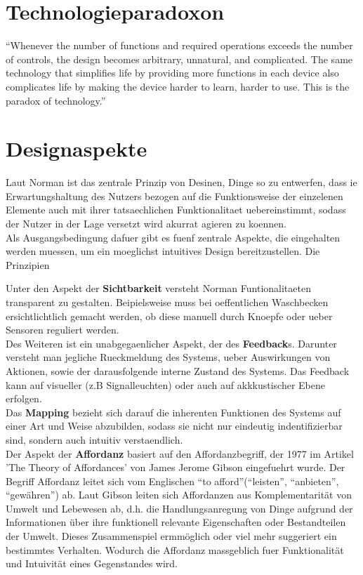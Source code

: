 \documentclass[parskip,headsepline, headtopline, %
footsepline, oneside, 12pt, headings=small]{scrreprt}
\begin{document}
\section{Technologieparadoxon}

“Whenever the number of functions and required operations exceeds the number of controls, the design becomes arbitrary, unnatural, and complicated. 
	The same technology that simplifies life by providing more functions in each device also complicates life by making the device harder to learn, harder to use. This is the paradox of technology.”

\section{Designaspekte}

Laut Norman ist das zentrale Prinzip von Desinen, Dinge so zu entwerfen, dass ie Erwartungshaltung des Nutzers bezogen auf die Funktionsweise der einzelenen Elemente auch mit ihrer tatsaechlichen Funktionalitaet uebereinstimmt, sodass der Nutzer in der Lage versetzt wird akurrat agieren zu koennen.\\ 
Als Ausgangsbedingung dafuer gibt es fuenf zentrale Aspekte, die eingehalten werden muessen, um  ein moeglichst intuitives Design bereitzustellen. Die Prinzipien 
	
Unter den Aspekt der \textbf{Sichtbarkeit} versteht Norman Funtionalitaeten transparent zu gestalten. Beipielsweise muss bei oeffentlichen Waschbecken ersichtlichtlich gemacht werden, ob diese manuell durch Knoepfe oder ueber Sensoren reguliert werden.\\
   
Des Weiteren ist ein unabgegaenlicher Aspekt, der des \textbf{Feedback}s. Darunter versteht man jegliche Rueckmeldung des Systems, ueber Auswirkungen von Aktionen, sowie der darausfolgende interne Zustand des Systems. Das Feedback kann auf visueller (z.B Signalleuchten) oder auch auf akkkustischer Ebene erfolgen.\\
 
Das	\textbf{Mapping} bezieht sich darauf die inherenten Funktionen des Systems auf einer Art und Weise abzubilden, sodass sie nicht nur eindeutig indentifizierbar sind, sondern auch intuitiv verstaendlich.\\

Der Aspekt der \textbf{Affordanz} basiert auf den Affordanzbegriff, der 1977 im Artikel 'The Theory of Affordances' von James Jerome Gibson eingefuehrt wurde. Der Begriff Affordanz leitet sich vom Englischen “to afford”(“leisten”, “anbieten”, “gewähren”) ab. Laut Gibson leiten sich Affordanzen aus Komplementarität von Umwelt und Lebewesen ab, d.h.  
die Handlungsanregung von Dinge aufgrund der Informationen über ihre funktionell relevante Eigenschaften oder Bestandteilen der Umwelt. Dieses Zusammenspiel ermmöglich oder viel mehr suggeriert ein bestimmtes Verhalten. Wodurch die Affordanz massgeblich fuer Funktionalität und Intuivität eines Gegenstandes wird.
\end{document}
